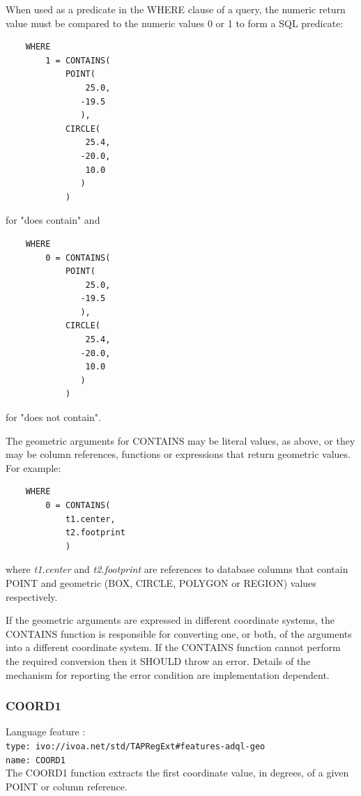 \documentclass[11pt,a4paper]{ivoa}
\begin{document}
When used as a predicate in the WHERE clause of a query, the numeric return
value must be compared to the numeric values 0 or 1 to form a SQL predicate:
\begin{verbatim}
    WHERE
        1 = CONTAINS(
            POINT(
                25.0,
               -19.5
               ),
            CIRCLE(
                25.4,
               -20.0,
                10.0
               )
            )
\end{verbatim}
\noindent
for "does contain" and
\begin{verbatim}
    WHERE
        0 = CONTAINS(
            POINT(
                25.0,
               -19.5
               ),
            CIRCLE(
                25.4,
               -20.0,
                10.0
               )
            )
\end{verbatim}
\noindent
for "does not contain".


The geometric arguments for CONTAINS may be literal values, as above,
or they may be column references, functions or expressions that return
geometric values.
For example:
\begin{verbatim}
    WHERE
        0 = CONTAINS(
            t1.center,
            t2.footprint
            )
\end{verbatim}
where \textit{t1.center} and \textit{t2.footprint} are references to
database columns that contain POINT and geometric (BOX, CIRCLE, POLYGON or REGION)
values respectively.

If the geometric arguments are expressed in different coordinate systems,
the CONTAINS function is responsible for converting one, or both, of the
arguments into a different coordinate system.
If the CONTAINS function cannot perform the required conversion then
it SHOULD throw an error.
Details of the mechanism for reporting the error condition are
implementation dependent.

\subsubsection{COORD1}
\label{sec:functions.geom.coord1}
{\footnotesize Language feature :}\\
{\footnotesize \verb|type: ivo://ivoa.net/std/TAPRegExt#features-adql-geo|}\\
{\footnotesize \verb|name: COORD1|}\\

The COORD1 function extracts the first coordinate value, in degrees, of a given
POINT  or column reference.
\end{document}
